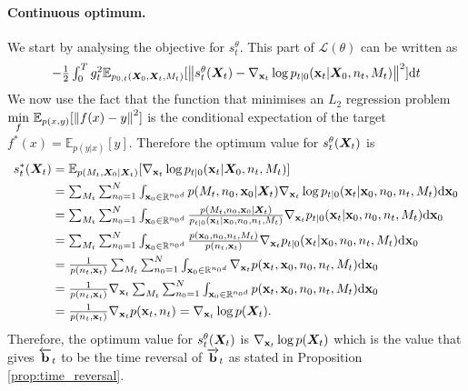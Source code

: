 \paragraph{Continuous optimum.} We start by analysing the objective for
$s_t^\theta$. This part of $\mathcal{L}(\theta)$ can be written as
\begin{equation}
  \textstyle 
    -\frac{1}{2} \int_{0}^T g_t^2 \mathbb{E}_{p_{0,t}({\bm{X}}_0, {\bm{X}}_t, M_t)} [ \left\lVert s_t^\theta({\bm{X}}_t) - \nabla_{{\mathbf{x}}_t} \log p_{t|0}({\mathbf{x}}_t | {\bm{X}}_0, n_t, M_t) \right\rVert^2 ] \mathrm{d} t
\end{equation}
We now use the fact that the function that minimises an $L_2$ regression problem $\underset{f}{\text{min}} \,\, \mathbb{E}_{p(x, y)} [ \left\lVert f(x) - y\right\rVert^2 ]$ is the conditional expectation of the target $f^*(x) = \mathbb{E}_{p(y|x)} [ y]$. Therefore the optimum value for $s_t^\theta({\bm{X}}_t)$ is
\begin{align}
    s_t^*({\bm{X}}_t) &\textstyle = \mathbb{E}_{p(M_t, {\bm{X}}_0 | {\bm{X}}_t)} [ \nabla_{{\mathbf{x}}_t} \log p_{t|0}({\mathbf{x}}_t | {\bm{X}}_0, n_t, M_t) ]\\
    &\textstyle = \sum_{M_t} \sum_{n_0=1}^N \int_{{\mathbf{x}}_0 \in \mathbb{R}^{n_0 d}} p(M_t, n_0, {\mathbf{x}}_0 | {\bm{X}}_t) \nabla_{{\mathbf{x}}_t} \log p_{t|0}({\mathbf{x}}_t | {\mathbf{x}}_0, n_0, n_t, M_t) \mathrm{d} {\mathbf{x}}_0\\
    &\textstyle = \sum_{M_t} \sum_{n_0=1}^N \int_{{\mathbf{x}}_0 \in \mathbb{R}^{n_0 d}} \frac{p(M_t, n_0, {\mathbf{x}}_0 | {\bm{X}}_t)}{p_{t|0}({\mathbf{x}}_t | {\mathbf{x}}_0, n_0, n_t, M_t)} \nabla_{{\mathbf{x}}_t} p_{t|0}({\mathbf{x}}_t | {\mathbf{x}}_0, n_0, n_t, M_t) \mathrm{d} {\mathbf{x}}_0\\
    &\textstyle = \sum_{M_t} \sum_{n_0=1}^N \int_{{\mathbf{x}}_0 \in \mathbb{R}^{n_0 d}} \frac{p({\mathbf{x}}_0, n_0, n_t, M_t)}{p(n_t, {\mathbf{x}}_t)} \nabla_{{\mathbf{x}}_t} p_{t|0}({\mathbf{x}}_t | {\mathbf{x}}_0, n_0, n_t, M_t) \mathrm{d} {\mathbf{x}}_0\\
    &\textstyle = \frac{1}{p(n_t, {\mathbf{x}}_t)} \sum_{M_t} \sum_{n_0=1}^N \int_{{\mathbf{x}}_0 \in \mathbb{R}^{n_0 d}}  \nabla_{{\mathbf{x}}_t} p({\mathbf{x}}_t, {\mathbf{x}}_0, n_0, n_t, M_t) \mathrm{d} {\mathbf{x}}_0\\
    &\textstyle = \frac{1}{p(n_t, {\mathbf{x}}_t)} \nabla_{{\mathbf{x}}_t} \sum_{M_t} \sum_{n_0=1}^N \int_{{\mathbf{x}}_0 \in \mathbb{R}^{n_0 d}}  p({\mathbf{x}}_t, {\mathbf{x}}_0, n_0, n_t, M_t) \mathrm{d} {\mathbf{x}}_0\\
    &\textstyle = \frac{1}{p(n_t, {\mathbf{x}}_t)} \nabla_{{\mathbf{x}}_t} p({\mathbf{x}}_t, n_t) \textstyle = \nabla_{{\mathbf{x}}_t}\log p({\bm{X}}_t) . 
\end{align}
Therefore, the optimum value for $s_t^\theta({\bm{X}}_t)$ is $\nabla_{{\mathbf{x}}_t} \log p({\bm{X}}_t)$ which is the value that gives $\overleftarrow{\mathbf{b}}_t$ to be the time reversal of $\overrightarrow{\mathbf{b}}_t$ as stated in Proposition \ref{prop:time_reversal}.\\

